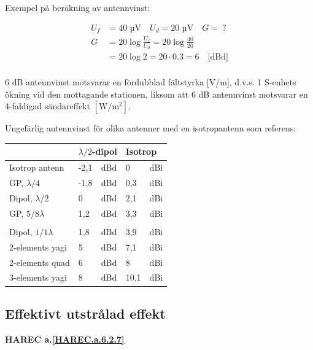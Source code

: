 Exempel på beräkning av antennvinst:

\begin{align*}
  U_f &= 40\text{ µV} \quad U_d = 20\text{ µV} \quad G =\ ? \\
  G &= 20 \log\frac{U_f}{U_d} = 20 \log\frac{40}{20} \\
  &= 20 \log 2 = 20\cdot 0.3 = 6 \quad \text{[dBd]} \\
\end{align*}

6 dB antennvinst motsvarar en fördubblad fältstyrka [V/m], d.v.s. 1
S-enhets ökning vid den mottagande stationen, liksom att 6 dB
antennvinst motsvarar en 4-faldigad sändareffekt \(\mathrm{[W/m^2]}\).

Ungefärlig antennvinst för olika antenner med en isotropantenn som referens:
\begin{tabular}{l|ll|ll}
  & \multicolumn{2}{l|}{\(\lambda/2\)-dipol} &
  \multicolumn{2}{l}{Isotrop} \\
  \hline
  Isotrop antenn       & -2,1 & dBd & 0   & dBi \\
  GP, \(\lambda/4\)    & -1,8 & dBd & 0,3 & dBi \\
  Dipol, \(\lambda/2\) & 0    & dBd & 2,1 & dBi \\
  GP, \(5/8\lambda\)   & 1,2  & dBd & 3,3 & dBi \\
  & & & & \\
  Dipol, \(1/1\lambda\) & 1,8 & dBd & 3,9  & dBi \\
  2-elements yagi       & 5   & dBd & 7,1  & dBi \\
  2-elements quad       & 6   & dBd & 8    & dBi \\
  3-elements yagi       & 8   & dBd & 10,1 & dBi \\
\end{tabular}


\subsection{Effektivt utstrålad effekt}
\textbf{
HAREC a.\ref{HAREC.a.6.2.7}\label{myHAREC.a.6.2.7}
}

